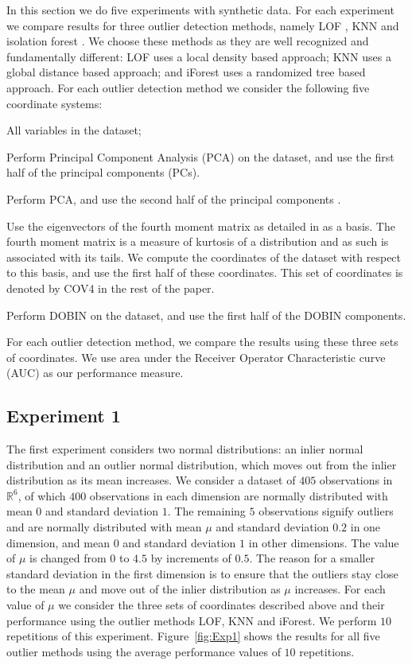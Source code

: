 \documentclass[letter,12pt]{article}
\begin{document}
In this section we do {\color{blue} five} experiments with synthetic data. For each experiment we compare results for three outlier detection methods, namely LOF \citep{breunig2000lof}, KNN \citep{ramaswamy2000efficient} and isolation forest \citep{liu2008isolation}. We choose these methods as they are well recognized and fundamentally different: LOF uses a local density based approach; KNN uses a global distance based approach; and iForest uses a randomized tree based approach. For each outlier detection method we consider the following {\color{blue} five} coordinate systems:
\begin{enumerate}
	\item All variables in the dataset;
	\item Perform Principal Component Analysis (PCA) on the dataset, and use the first half of the principal components (PCs).
	{\color{blue} \item Perform PCA, and use the second half of the principal components \citep{amnarttrakul2011new}. 
	\item Use the eigenvectors of the fourth moment matrix as detailed in \cite{tyler2009invariant} as a basis. The fourth moment matrix is a measure of  kurtosis of a distribution and as such is associated with its tails.  We compute the coordinates of the dataset with respect to this basis, and use the first half of these coordinates. This set of coordinates is denoted by COV4 in the rest of the paper.  }
	\item Perform DOBIN on the dataset, and use the first half of the DOBIN components.
\end{enumerate}
For each outlier detection method, we compare the results using these three sets of coordinates. We use area under the Receiver Operator Characteristic curve (AUC) as our performance measure.

\subsection{Experiment 1}

The first experiment considers two normal distributions: an inlier normal distribution and an outlier normal distribution, which moves out from the inlier distribution as its mean increases. We consider a dataset of $405$ observations in $\mathbb{R}^6$, of which $400$ observations in each dimension are normally distributed with mean $0$ and standard deviation $1$. The remaining $5$ observations signify outliers and are normally distributed with mean $\mu$ and standard deviation $0.2$ in one dimension, and mean $0$ and standard deviation $1$ in other dimensions. The value of $\mu$ is changed from $0$ to $4.5$ by increments of $0.5$. The reason for a smaller standard deviation in the first dimension is to ensure that the outliers stay close to the mean $\mu$ and move out of the inlier distribution as $\mu$ increases. For each value of $\mu$ we consider the three sets of coordinates described above and their performance using the outlier methods LOF, KNN and iForest. We perform $10$ repetitions of this experiment. Figure~\ref{fig:Exp1} shows the results for all {\color{blue} five} outlier methods using the average performance values of $10$ repetitions.
\end{document}
